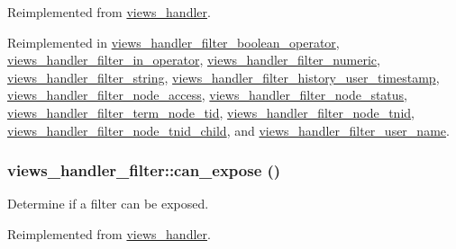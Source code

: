 Reimplemented from \hyperlink{classviews__handler_27a5cb35f3f17322957730a95b6be11e}{views\_\-handler}.

Reimplemented in \hyperlink{classviews__handler__filter__boolean__operator_7b58a9b58ae9778383b6a215834d7cdb}{views\_\-handler\_\-filter\_\-boolean\_\-operator}, \hyperlink{classviews__handler__filter__in__operator_2c17bde9b5cb3498d31786ba888d545c}{views\_\-handler\_\-filter\_\-in\_\-operator}, \hyperlink{classviews__handler__filter__numeric_aece85d3c36d4186c871cc55e636f4f2}{views\_\-handler\_\-filter\_\-numeric}, \hyperlink{classviews__handler__filter__string_3152b0f2ce38cf493327e2a91b9c9f5e}{views\_\-handler\_\-filter\_\-string}, \hyperlink{classviews__handler__filter__history__user__timestamp_a5eeead15fcc3d6e74ca62c31676e109}{views\_\-handler\_\-filter\_\-history\_\-user\_\-timestamp}, \hyperlink{classviews__handler__filter__node__access_2f3abe4aa9418904e52937d1549fd560}{views\_\-handler\_\-filter\_\-node\_\-access}, \hyperlink{classviews__handler__filter__node__status_fad09e6f2c94d8f6748b48c3ce137a25}{views\_\-handler\_\-filter\_\-node\_\-status}, \hyperlink{classviews__handler__filter__term__node__tid_392046588b13b1b76223eb22ba4ff660}{views\_\-handler\_\-filter\_\-term\_\-node\_\-tid}, \hyperlink{classviews__handler__filter__node__tnid_037932cf19297e4b8544c24747509823}{views\_\-handler\_\-filter\_\-node\_\-tnid}, \hyperlink{classviews__handler__filter__node__tnid__child_3762760577c3801276a683271be90e47}{views\_\-handler\_\-filter\_\-node\_\-tnid\_\-child}, and \hyperlink{classviews__handler__filter__user__name_ba7659d0d6c937d9c346e8ed3af532b6}{views\_\-handler\_\-filter\_\-user\_\-name}.\hypertarget{classviews__handler__filter_f0e5810a2a2f194cd6af0fca9c858756}{
\subsubsection[{can\_\-expose}]{\setlength{\rightskip}{0pt plus 5cm}views\_\-handler\_\-filter::can\_\-expose ()}}
\label{classviews__handler__filter_f0e5810a2a2f194cd6af0fca9c858756}


Determine if a filter can be exposed. 

Reimplemented from \hyperlink{classviews__handler_92517d122d69dc6f64a9edb80d55057d}{views\_\-handler}.

